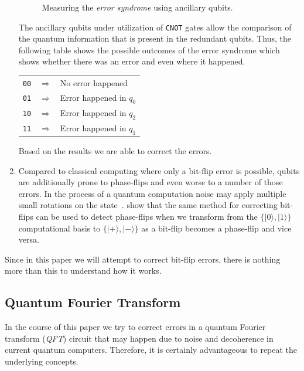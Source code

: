 \begin{enumerate}
\begin{figure}[H]
        \caption{Measuring the \emph{error syndrome} using ancillary qubits.}
        \label{fig:reading-ancilla-qubits-circuit}
    \end{figure}
    The ancillary qubits under utilization of \texttt{CNOT} gates allow the comparison of the quantum information that is present in the redundant qubits.
    Thus, the following table shows the possible outcomes of the error syndrome which shows whether there was an error and even where it happened.
    \begin{center}
        \begin{tabular}{ r c l }
            \texttt{00} & \(\Rightarrow\) & No error happened \\
            \texttt{01} & \(\Rightarrow\) & Error happened in \(q_0\) \\
            \texttt{10} & \(\Rightarrow\) & Error happened in \(q_2\) \\
            \texttt{11} & \(\Rightarrow\) & Error happened in \(q_1\)
        \end{tabular}
    \end{center}
    Based on the results we are able to correct the errors.
    \item Compared to classical computing where only a bit-flip error is possible, qubits are additionally prone to phase-flips and even worse to a number of those errors.
    In the process of a quantum computation noise may apply multiple small rotations on the state~\cite[p. 460]{benenti2004principles}.
     show that the same method for correcting bit-flips can be used to detect phase-flips when we transform from the \(\{|0\rangle, |1\rangle\}\) computational basis to \(\{|+\rangle, |-\rangle\}\) as a bit-flip becomes a phase-flip and vice versa.
\end{enumerate}

Since in this paper we will attempt to correct bit-flip errors, there is nothing more than this to understand how it works.

\subsection{Quantum Fourier Transform}
\label{subsec:quantum-fourier-transform}

In the course of this paper we try to correct errors in a quantum Fourier transform (\emph{QFT}) circuit that may happen due to noise and decoherence in current quantum computers.
Therefore, it is certainly advantageous to repeat the underlying concepts.

